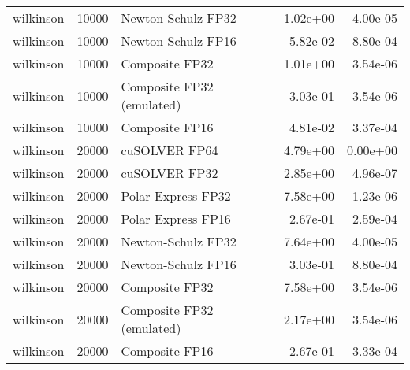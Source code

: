 \begin{table}
\begin{tabular}{lrlrr}
wilkinson & 10000 &        Newton-Schulz FP32 &  1.02e+00 &        4.00e-05 \\
wilkinson & 10000 &        Newton-Schulz FP16 &  5.82e-02 &        8.80e-04 \\
wilkinson & 10000 &            Composite FP32 &  1.01e+00 &        3.54e-06 \\
wilkinson & 10000 & Composite FP32 (emulated) &  3.03e-01 &        3.54e-06 \\
wilkinson & 10000 &            Composite FP16 &  4.81e-02 &        3.37e-04 \\
wilkinson & 20000 &             cuSOLVER FP64 &  4.79e+00 &        0.00e+00 \\
wilkinson & 20000 &             cuSOLVER FP32 &  2.85e+00 &        4.96e-07 \\
wilkinson & 20000 &        Polar Express FP32 &  7.58e+00 &        1.23e-06 \\
wilkinson & 20000 &        Polar Express FP16 &  2.67e-01 &        2.59e-04 \\
wilkinson & 20000 &        Newton-Schulz FP32 &  7.64e+00 &        4.00e-05 \\
wilkinson & 20000 &        Newton-Schulz FP16 &  3.03e-01 &        8.80e-04 \\
wilkinson & 20000 &            Composite FP32 &  7.58e+00 &        3.54e-06 \\
wilkinson & 20000 & Composite FP32 (emulated) &  2.17e+00 &        3.54e-06 \\
wilkinson & 20000 &            Composite FP16 &  2.67e-01 &        3.33e-04 \\
\bottomrule
\end{tabular}
\end{table}
